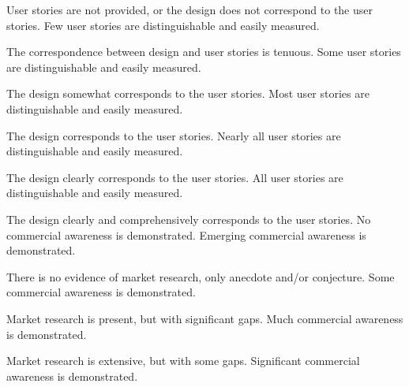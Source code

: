 \documentclass{../fal_assignment}
\begin{document}
\begin{markingrubric}
        \grade\fail User stories are not provided, or the design does not correspond to the user stories.
        \grade Few user stories are distinguishable and easily measured.
            \par The correspondence between design and user stories is tenuous.
        \grade Some user stories are distinguishable and easily measured.
            \par The design somewhat corresponds to the user stories.
        \grade Most user stories are distinguishable and easily measured.
            \par The design corresponds to the user stories.
        \grade Nearly all user stories are distinguishable and easily measured.
            \par The design clearly corresponds to the user stories.
        \grade All user stories are distinguishable and easily measured.
            \par The design clearly and comprehensively corresponds to the user stories.
        \grade\fail No commercial awareness is demonstrated.
        \grade Emerging commercial awareness is demonstrated.
            \par There is no evidence of market research, only anecdote and/or conjecture.
        \grade Some commercial awareness is demonstrated.
            \par Market research is present, but with significant gaps.
        \grade Much commercial awareness is demonstrated.
            \par Market research is extensive, but with some gaps.
        \grade Significant commercial awareness is demonstrated.

\end{markingrubric}
\end{document}
